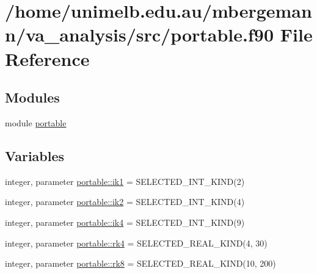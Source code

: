 \hypertarget{portable_8f90}{}\section{/home/unimelb.edu.\+au/mbergemann/va\+\_\+analysis/src/portable.f90 File Reference}
\label{portable_8f90}
\subsection*{Modules}
\begin{DoxyCompactItemize}
\item 
module \hyperlink{namespaceportable}{portable}
\end{DoxyCompactItemize}
\subsection*{Variables}
\begin{DoxyCompactItemize}
\item 
integer, parameter \hyperlink{namespaceportable_aaeaca599bf9baead529cbb42680f0f0b}{portable\+::ik1} = S\+E\+L\+E\+C\+T\+E\+D\+\_\+\+I\+N\+T\+\_\+\+K\+I\+ND(2)
\item 
integer, parameter \hyperlink{namespaceportable_a35a0fbff20f9df8a8a5de95c97dc7d5d}{portable\+::ik2} = S\+E\+L\+E\+C\+T\+E\+D\+\_\+\+I\+N\+T\+\_\+\+K\+I\+ND(4)
\item 
integer, parameter \hyperlink{namespaceportable_aa110cf333432508140602ea192c4b2ea}{portable\+::ik4} = S\+E\+L\+E\+C\+T\+E\+D\+\_\+\+I\+N\+T\+\_\+\+K\+I\+ND(9)
\item 
integer, parameter \hyperlink{namespaceportable_abaed22a509442771d3fba69bebda0b33}{portable\+::rk4} = S\+E\+L\+E\+C\+T\+E\+D\+\_\+\+R\+E\+A\+L\+\_\+\+K\+I\+ND(4, 30)
\item 
integer, parameter \hyperlink{namespaceportable_a609d4b38b4f128b310e288b1861ad9bd}{portable\+::rk8} = S\+E\+L\+E\+C\+T\+E\+D\+\_\+\+R\+E\+A\+L\+\_\+\+K\+I\+ND(10, 200)
\end{DoxyCompactItemize}
